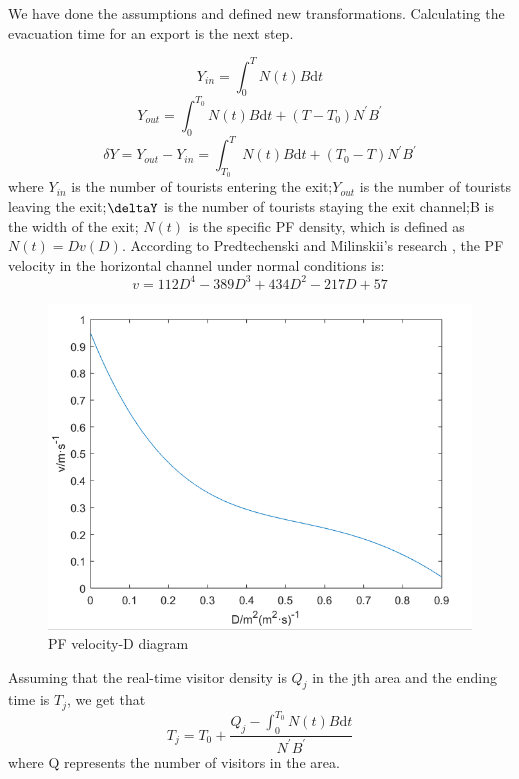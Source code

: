 
We have done the assumptions and defined new transformations. Calculating the evacuation time for an export is the next step.

\[
Y_{in}=\int_0^TN(t)B\mathrm{d}t
\]
\[
Y_{out}=\int_0^{T_0}N(t)B\mathrm{d}t+(T-T_0)N^{'}B^{'}
\]
\[
\delta Y=Y_{out}-Y_{in}=\int_{T_0}^TN(t)B\mathrm{d}t+(T_0-T)N^{'}B^{'}
\]
where $Y_{in}$ is the number of tourists entering the exit;$Y_{out}$ is the number of tourists leaving the exit;$\deltaY$ is the number of tourists staying the exit channel;B is the width of the exit; $N(t)$ is the specific PF density, which is defined as $N(t)=Dv(D)$. According to Predtechenski and Milinskii's research \cite{pauls1987calculating}, the PF velocity in the horizontal channel under normal conditions is:
\[
v=112D^4-389D^3+434D^2-217D+57
\]
\begin{figure}[H]
    \centering
    \includegraphics[scale=0.6]{1.png}
    \caption{PF velocity-D diagram}
    \label{1}
\end{figure}
Assuming that the real-time visitor density is $Q_j$ in the jth area and the ending time is $T_j$, we get that
\begin{equation}
    T_j=T_0+\frac{Q_j-\int_0^{T_0}N(t)B\mathrm{d}t}{N^{'}B^{'}}
    \label{equation1}
\end{equation}
where Q represents the number of visitors in the area.

